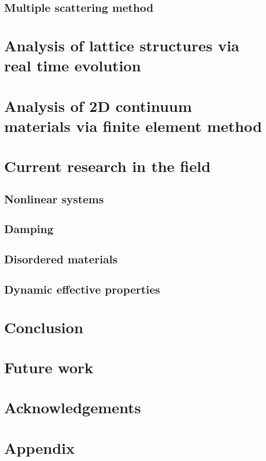 \documentclass{article}
\begin{document}
\subsection{Multiple scattering method}
\section{Analysis of lattice structures via real time evolution}
\section{Analysis of 2D continuum materials via finite element method}
\section{Current research in the field}
\subsection{Nonlinear systems}
\subsection{Damping}
\subsection{Disordered materials}
\subsection{Dynamic effective properties}
\section{Conclusion}
\section{Future work}
\section{Acknowledgements}
\appendix
\section{Appendix}
\end{document}
